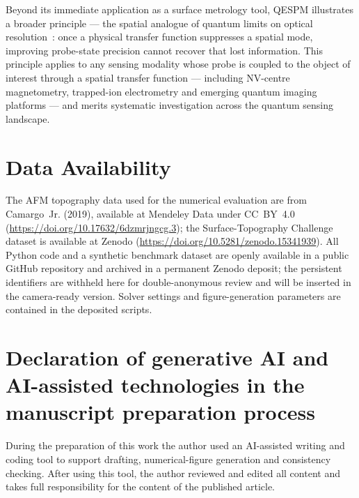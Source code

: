 \documentclass[12pt,a4paper]{article}
\begin{document}
Beyond its immediate application as a surface metrology tool, QESPM
illustrates a broader principle --- the spatial analogue of quantum
limits on optical resolution~\cite{kolobov2000quantum}: once a physical
transfer function suppresses a spatial mode, improving probe-state
precision cannot recover that lost information.  This principle applies
to any sensing modality whose probe is coupled to the object of interest
through a spatial transfer function --- including NV-centre magnetometry,
trapped-ion electrometry and emerging quantum imaging platforms --- and
merits systematic investigation across the quantum sensing landscape.

\section*{Data Availability}

The AFM topography data used for the numerical evaluation are from
Camargo~Jr. (2019), available at Mendeley Data under CC~BY~4.0
(\url{https://doi.org/10.17632/6dzmrjngcg.3}); the Surface-Topography
Challenge dataset is available at Zenodo
(\url{https://doi.org/10.5281/zenodo.15341939}).
All Python code and a synthetic benchmark dataset are openly available in
a public GitHub repository and archived in a permanent Zenodo deposit;
the persistent identifiers are withheld here for double-anonymous review
and will be inserted in the camera-ready version.  Solver settings and
figure-generation parameters are contained in the deposited scripts.

\section*{Declaration of generative AI and AI-assisted technologies in the
manuscript preparation process}

During the preparation of this work the author used an AI-assisted
writing and coding tool to support drafting, numerical-figure generation
and consistency checking.  After using this tool, the author reviewed and
edited all content and takes full responsibility for the content of the
published article.



\makeatletter
\g@addto@macro\@openbib@code{\setlength{\itemsep}{0pt}%
                            \setlength{\parsep}{0pt}}
\makeatother
{\footnotesize\fontsize{10}{10.5}\selectfont }
\end{document}
